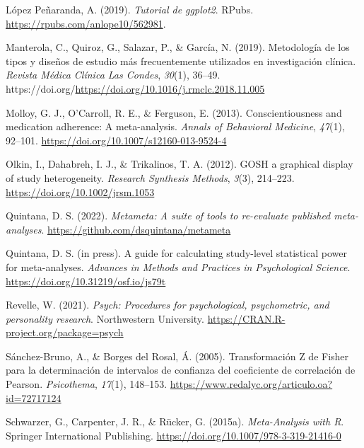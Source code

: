 \documentclass[
  bookmarksnumbered]{article}
\newlength{\cslhangindent}
\newlength{\cslentryspacingunit} %
\newenvironment{CSLReferences}[2] %
 {%
  \setlength{\parindent}{0pt}
  \ifodd #1
  \let\oldpar\par
  \def\par{\hangindent=\cslhangindent\oldpar}
  \fi
  \setlength{\parskip}{#2\cslentryspacingunit}
 }%
 {}
\begin{document}
\begin{CSLReferences}{1}{0}
\leavevmode{}%
López Peñaranda, A. (2019). \emph{Tutorial de ggplot2}. RPubs. \url{https://rpubs.com/anlope10/562981}.

\leavevmode{}%
Manterola, C., Quiroz, G., Salazar, P., \& García, N. (2019). Metodología de los tipos y diseños de estudio más frecuentemente utilizados en investigación clínica. \emph{Revista Médica Clínica Las Condes}, \emph{30}(1), 36--49. https://doi.org/\url{https://doi.org/10.1016/j.rmclc.2018.11.005}

\leavevmode{}%
Molloy, G. J., O'Carroll, R. E., \& Ferguson, E. (2013). Conscientiousness and medication adherence: A meta-analysis. \emph{Annals of Behavioral Medicine}, \emph{47}(1), 92--101. \url{https://doi.org/10.1007/s12160-013-9524-4}

\leavevmode{}%
Olkin, I., Dahabreh, I. J., \& Trikalinos, T. A. (2012). {GOSH} \textendash{} a graphical display of study heterogeneity. \emph{Research Synthesis Methods}, \emph{3}(3), 214--223. \url{https://doi.org/10.1002/jrsm.1053}

\leavevmode{}%
Quintana, D. S. (2022). \emph{Metameta: A suite of tools to re-evaluate published meta-analyses}. \url{https://github.com/dsquintana/metameta}

\leavevmode{}%
Quintana, D. S. (in press). A guide for calculating study-level statistical power for meta-analyses. \emph{{Advances in Methods and Practices in Psychological Science}}. \url{https://doi.org/10.31219/osf.io/js79t}

\leavevmode{}%
Revelle, W. (2021). \emph{Psych: Procedures for psychological, psychometric, and personality research}. Northwestern University. \url{https://CRAN.R-project.org/package=psych}

\leavevmode{}%
Sánchez-Bruno, A., \& Borges del Rosal, Á. (2005). {Transformación Z de Fisher para la determinación de intervalos de confianza del coeficiente de correlación de Pearson}. \emph{Psicothema}, \emph{17}(1), 148--153. \url{https://www.redalyc.org/articulo.oa?id=72717124}

\leavevmode{}%
Schwarzer, G., Carpenter, J. R., \& Rücker, G. (2015a). \emph{Meta-{Analysis} with {R}}. {Springer International Publishing}. \url{https://doi.org/10.1007/978-3-319-21416-0}


\end{CSLReferences}
\end{document}
